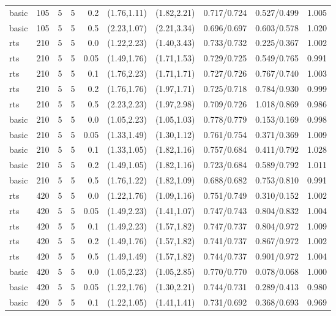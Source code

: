 \begin{tabular}{llrrrccccc}
basic & 105 & 5 & 5 & 0.2 & (1.76,1.11) & (1.82,2.21) & 0.717/0.724 & 0.527/0.499 & 1.005 \\
basic & 105 & 5 & 5 & 0.5 & (2.23,1.07) & (2.21,3.34) & 0.696/0.697 & 0.603/0.578 & 1.020 \\
rts & 210 & 5 & 5 & 0.0 & (1.22,2.23) & (1.40,3.43) & 0.733/0.732 & 0.225/0.367 & 1.002 \\
rts & 210 & 5 & 5 & 0.05 & (1.49,1.76) & (1.71,1.53) & 0.729/0.725 & 0.549/0.765 & 0.991 \\
rts & 210 & 5 & 5 & 0.1 & (1.76,2.23) & (1.71,1.71) & 0.727/0.726 & 0.767/0.740 & 1.003 \\
rts & 210 & 5 & 5 & 0.2 & (1.76,1.76) & (1.97,1.71) & 0.725/0.718 & 0.784/0.930 & 0.999 \\
rts & 210 & 5 & 5 & 0.5 & (2.23,2.23) & (1.97,2.98) & 0.709/0.726 & 1.018/0.869 & 0.986 \\
basic & 210 & 5 & 5 & 0.0 & (1.05,2.23) & (1.05,1.03) & 0.778/0.779 & 0.153/0.169 & 0.998 \\
basic & 210 & 5 & 5 & 0.05 & (1.33,1.49) & (1.30,1.12) & 0.761/0.754 & 0.371/0.369 & 1.009 \\
basic & 210 & 5 & 5 & 0.1 & (1.33,1.05) & (1.82,1.16) & 0.757/0.684 & 0.411/0.792 & 1.028 \\
basic & 210 & 5 & 5 & 0.2 & (1.49,1.05) & (1.82,1.16) & 0.723/0.684 & 0.589/0.792 & 1.011 \\
basic & 210 & 5 & 5 & 0.5 & (1.76,1.22) & (1.82,1.09) & 0.688/0.682 & 0.753/0.810 & 0.991 \\
rts & 420 & 5 & 5 & 0.0 & (1.22,1.76) & (1.09,1.16) & 0.751/0.749 & 0.310/0.152 & 1.002 \\
rts & 420 & 5 & 5 & 0.05 & (1.49,2.23) & (1.41,1.07) & 0.747/0.743 & 0.804/0.832 & 1.004 \\
rts & 420 & 5 & 5 & 0.1 & (1.49,2.23) & (1.57,1.82) & 0.747/0.737 & 0.804/0.972 & 1.009 \\
rts & 420 & 5 & 5 & 0.2 & (1.49,1.76) & (1.57,1.82) & 0.741/0.737 & 0.867/0.972 & 1.002 \\
rts & 420 & 5 & 5 & 0.5 & (1.49,1.49) & (1.57,1.82) & 0.744/0.737 & 0.901/0.972 & 1.004 \\
basic & 420 & 5 & 5 & 0.0 & (1.05,2.23) & (1.05,2.85) & 0.770/0.770 & 0.078/0.068 & 1.000 \\
basic & 420 & 5 & 5 & 0.05 & (1.22,1.76) & (1.30,2.21) & 0.744/0.731 & 0.289/0.413 & 0.980 \\
basic & 420 & 5 & 5 & 0.1 & (1.22,1.05) & (1.41,1.41) & 0.731/0.692 & 0.368/0.693 & 0.969 \\

\end{tabular}
